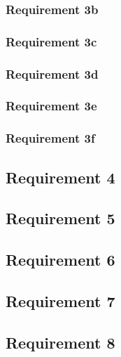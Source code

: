 \documentclass[a4paper]{article}
\begin{document}
    \subsubsection{Requirement 3b}
    

    \subsubsection{Requirement 3c}
    

    \subsubsection{Requirement 3d}
    

    \subsubsection{Requirement 3e}
    

    \subsubsection{Requirement 3f}
    

    \subsection{Requirement 4}
    

    \subsection{Requirement 5}
    

    \subsection{Requirement 6}
    

    \subsection{Requirement 7}
    

    \subsection{Requirement 8}
    
\end{document}
